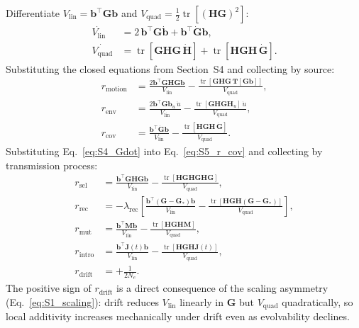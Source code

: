\documentclass[11pt]{article}
\newcommand{\vect}[1]{\boldsymbol{#1}}
\newcommand{\mat}[1]{\mathbf{#1}}
\newcommand{\Vlin}{V_{\mathrm{lin}}}
\newcommand{\Vquad}{V_{\mathrm{quad}}}
\newcommand{\tr}{\operatorname{tr}}
\begin{document}
Differentiate $\Vlin = \vect{b}^\top\mat{G}\vect{b}$ and
$\Vquad = \tfrac{1}{2}\tr[(\mat{H}\mat{G})^2]$:
\begin{align}
\dot{\Vlin}
&= 2\,\vect{b}^\top\mat{G}\dot{\vect{b}}
  + \vect{b}^\top\dot{\mat{G}}\vect{b},
\label{eq:S5_Vlindot} \\[4pt]
\dot{\Vquad}
&= \tr[\mat{G}\mat{H}\mat{G}\,\dot{\mat{H}}]
  + \tr[\mat{H}\mat{G}\mat{H}\,\dot{\mat{G}}].
\label{eq:S5_Vquaddot}
\end{align}
Substituting the closed equations from Section~S4
and collecting by source:
\begin{align}
r_{\mathrm{motion}}
&= \frac{2\vect{b}^\top\mat{G}\mat{H}\mat{G}\vect{b}}{\Vlin}
   - \frac{\tr[\mat{G}\mat{H}\mat{G}\,\mat{T}[\mat{G}\vect{b}]]}
          {\Vquad},
\label{eq:S5_r_motion} \\[6pt]
r_{\mathrm{env}}
&= \frac{2\vect{b}^\top\mat{G}\vect{b}_u\,\dot{u}}{\Vlin}
   - \frac{\tr[\mat{G}\mat{H}\mat{G}\mat{H}_u]\,\dot{u}}{\Vquad},
\label{eq:S5_r_env} \\[6pt]
r_{\mathrm{cov}}
&= \frac{\vect{b}^\top\dot{\mat{G}}\vect{b}}{\Vlin}
   - \frac{\tr[\mat{H}\mat{G}\mat{H}\,\dot{\mat{G}}]}{\Vquad}.
\label{eq:S5_r_cov}
\end{align}
Substituting Eq.~\eqref{eq:S4_Gdot} into
Eq.~\eqref{eq:S5_r_cov} and collecting by transmission process:
\begin{align}
r_{\mathrm{sel}}
&= \frac{\vect{b}^\top\mat{G}\mat{H}\mat{G}\vect{b}}{\Vlin}
   - \frac{\tr[\mat{H}\mat{G}\mat{H}\mat{G}\mat{H}\mat{G}]}
          {\Vquad},
\label{eq:S5_r_sel} \\[6pt]
r_{\mathrm{rec}}
&= -\lambda_{\mathrm{rec}}
   \!\left[
   \frac{\vect{b}^\top(\mat{G}-\mat{G}_*)\vect{b}}{\Vlin}
   - \frac{\tr[\mat{H}\mat{G}\mat{H}(\mat{G}-\mat{G}_*)]}
          {\Vquad}
   \right],
\label{eq:S5_r_rec} \\[6pt]
r_{\mathrm{mut}}
&= \frac{\vect{b}^\top\mat{M}\vect{b}}{\Vlin}
   - \frac{\tr[\mat{H}\mat{G}\mat{H}\mat{M}]}{\Vquad},
\label{eq:S5_r_mut} \\[6pt]
r_{\mathrm{intro}}
&= \frac{\vect{b}^\top\mat{J}(t)\vect{b}}{\Vlin}
   - \frac{\tr[\mat{H}\mat{G}\mat{H}\mat{J}(t)]}{\Vquad},
\label{eq:S5_r_intro} \\[6pt]
r_{\mathrm{drift}}
&= +\frac{1}{2N_e}.
\label{eq:S5_r_drift}
\end{align}
The positive sign of $r_{\mathrm{drift}}$ is a direct consequence
of the scaling asymmetry (Eq.~\ref{eq:S1_scaling}): drift reduces
$\Vlin$ linearly in $\mat{G}$ but $\Vquad$ quadratically, so
local additivity increases mechanically under drift even as
evolvability declines.
\end{document}
